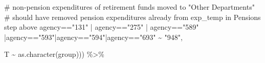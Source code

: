 \documentclass[
  letterpaper,
  DIV=11,
  numbers=noendperiod]{scrreport}
\newenvironment{Shaded}{\begin{snugshade}}{\end{snugshade}}
\newcommand{\CommentTok}[1]{\textcolor[rgb]{0.37,0.37,0.37}{#1}}
\newcommand{\FunctionTok}[1]{\textcolor[rgb]{0.28,0.35,0.67}{#1}}
\newcommand{\NormalTok}[1]{\textcolor[rgb]{0.00,0.23,0.31}{#1}}
\newcommand{\SpecialCharTok}[1]{\textcolor[rgb]{0.37,0.37,0.37}{#1}}
\newcommand{\StringTok}[1]{\textcolor[rgb]{0.13,0.47,0.30}{#1}}
\begin{document}
\begin{Shaded}
\begin{Highlighting}[]
    \CommentTok{\# non{-}pension expenditures of retirement funds moved to "Other Departments"}
    \CommentTok{\# should have removed pension expenditures already from exp\_temp in Pensions step above}
\NormalTok{    agency}\SpecialCharTok{==}\StringTok{"131"} \SpecialCharTok{|}\NormalTok{ agency}\SpecialCharTok{==}\StringTok{"275"} \SpecialCharTok{|}\NormalTok{ agency}\SpecialCharTok{==}\StringTok{"589"} \SpecialCharTok{|}\NormalTok{agency}\SpecialCharTok{==}\StringTok{"593"}\SpecialCharTok{|}\NormalTok{agency}\SpecialCharTok{==}\StringTok{"594"}\SpecialCharTok{|}\NormalTok{agency}\SpecialCharTok{==}\StringTok{"693"} \SpecialCharTok{\textasciitilde{}} \StringTok{"948"}\NormalTok{,}
    
\NormalTok{    T }\SpecialCharTok{\textasciitilde{}} \FunctionTok{as.character}\NormalTok{(group))) }\SpecialCharTok{\%\textgreater{}\%}


\end{Highlighting}
\end{Shaded}
\end{document}
